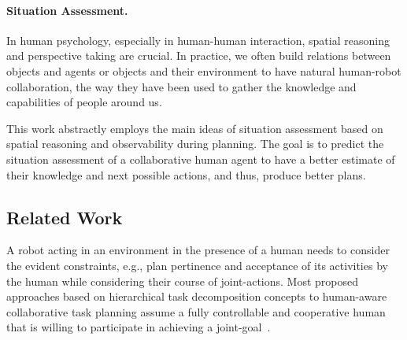 \documentclass[letterpaper]{article} %
\begin{document}
\paragraph{Situation Assessment.} In human psychology, especially in human-human interaction, spatial reasoning and perspective taking are crucial. 
In practice, we often build relations between objects and agents or objects and their environment to have natural human-robot collaboration, the way they have been used to gather the knowledge and capabilities of people around us. 



This work abstractly employs the main ideas of situation assessment based on spatial reasoning and observability during planning. The goal is to predict the situation assessment of a collaborative human agent to have a better estimate of their knowledge and next possible actions, and thus, produce better plans.

\subsection{Related Work}
A robot acting in an environment in the presence of a human needs to consider the evident constraints, e.g., plan pertinence and acceptance of its activities by the human while considering their course of joint-actions.
Most proposed approaches based on hierarchical task decomposition concepts to human-aware collaborative task planning assume a fully controllable and cooperative human that is willing to participate in achieving a joint-goal~\cite{sebastiani2017dealing,alami2006toward,lallement2014hatp,lallement2018hatp}.
\end{document}
